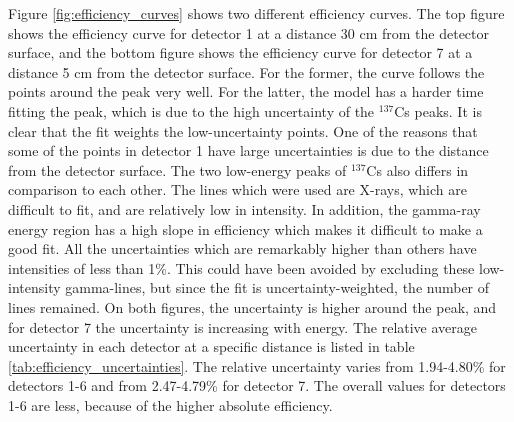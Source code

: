 Figure \ref{fig:efficiency_curves} shows two different efficiency curves. The top figure shows the efficiency curve for detector 1 at a distance 30 cm from the detector surface, and the bottom figure shows the efficiency curve for detector 7 at a distance 5 cm from the detector surface. For the former, the curve follows the points around the peak very well. For the latter, the model has a harder time fitting the peak, which is due to the high uncertainty of the $^{137}$Cs peaks. It is clear that the fit weights the low-uncertainty points. One of the reasons that some of the points in detector 1 have large uncertainties is due to the distance from the detector surface.  The two low-energy peaks of $^{137}$Cs also differs in comparison to each other. The lines which were used are X-rays, which are difficult to fit, and are relatively low in intensity. In addition, the gamma-ray energy region has a high slope in efficiency which makes it difficult to make a good fit.  All the uncertainties which are remarkably higher than others have intensities of less than 1\%. This could have been avoided by excluding these low-intensity gamma-lines, but since the fit is uncertainty-weighted, the number of lines remained. On both figures, the uncertainty is higher around the peak, and for detector 7 the uncertainty is increasing with energy. The relative average uncertainty in each detector at a specific distance is listed in table \ref{tab:efficiency_uncertainties}. The relative uncertainty varies from 1.94-4.80\% for detectors 1-6 and from 2.47-4.79\% for detector 7. The overall values for detectors 1-6 are less, because of the higher absolute efficiency. \\


